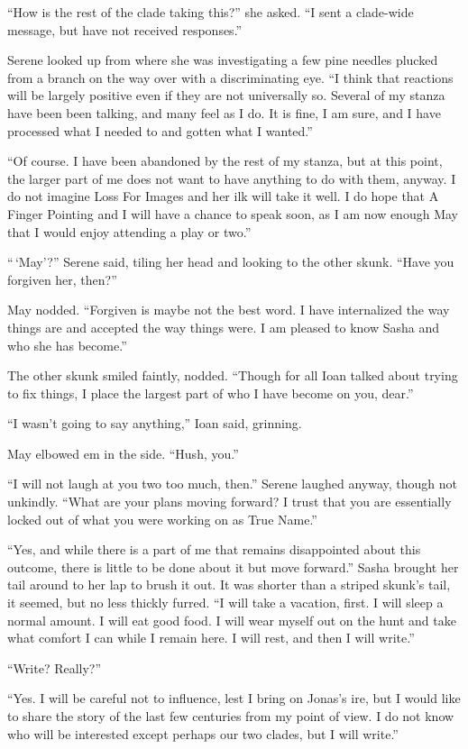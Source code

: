 ``How is the rest of the clade taking this?'' she asked. ``I sent a clade-wide message, but have not received responses.''

Serene looked up from where she was investigating a few pine needles plucked from a branch on the way over with a discriminating eye. ``I think that reactions will be largely positive even if they are not universally so. Several of my stanza have been been talking, and many feel as I do. It is fine, I am sure, and I have processed what I needed to and gotten what I wanted.''

``Of course. I have been abandoned by the rest of my stanza, but at this point, the larger part of me does not want to have anything to do with them, anyway. I do not imagine Loss For Images and her ilk will take it well. I do hope that A Finger Pointing and I will have a chance to speak soon, as I am now enough May that I would enjoy attending a play or two.''

``\,`May'?'' Serene said, tiling her head and looking to the other skunk. ``Have you forgiven her, then?''

May nodded. ``Forgiven is maybe not the best word. I have internalized the way things are and accepted the way things were. I am pleased to know Sasha and who she has become.''

The other skunk smiled faintly, nodded. ``Though for all Ioan talked about trying to fix things, I place the largest part of who I have become on you, dear.''

``I wasn't going to say anything,'' Ioan said, grinning.

May elbowed em in the side. ``Hush, you.''

``I will not laugh at you two too much, then.'' Serene laughed anyway, though not unkindly. ``What are your plans moving forward? I trust that you are essentially locked out of what you were working on as True Name.''

``Yes, and while there is a part of me that remains disappointed about this outcome, there is little to be done about it but move forward.'' Sasha brought her tail around to her lap to brush it out. It was shorter than a striped skunk's tail, it seemed, but no less thickly furred. ``I will take a vacation, first. I will sleep a normal amount. I will eat good food. I will wear myself out on the hunt and take what comfort I can while I remain here. I will rest, and then I will write.''

``Write? Really?''

``Yes. I will be careful not to influence, lest I bring on Jonas's ire, but I would like to share the story of the last few centuries from my point of view. I do not know who will be interested except perhaps our two clades, but I will write.''

